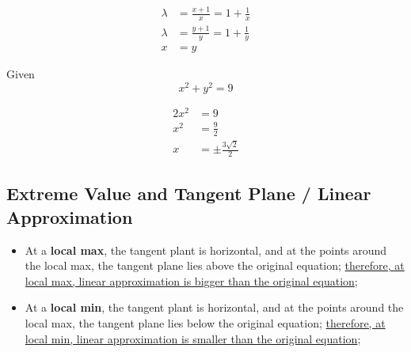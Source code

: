       \begin{align*}
        \lambda &= \frac{x + 1}{x} = 1 + \frac{1}{x} \\
        \lambda &= \frac{y + 1}{y} = 1 + \frac{1}{y} \\
        x &= y
      \end{align*}

      Given
      \begin{displaymath}
        x^{2} + y^{2} = 9
      \end{displaymath}

      \begin{align*}
        2x^{2} &= 9 \\
        x^{2} &= \frac{9}{2} \\
        x &= \pm \frac{3\sqrt{2}}{2}
      \end{align*}

  \subsection{Extreme Value and Tangent Plane / Linear Approximation}

    \begin{itemize}
      \item At a \textbf{local max}, the tangent plant is horizontal,
      and at the points around the local max, the tangent plane lies
      above the original equation;
      \ul{therefore, at local max, linear approximation is bigger than
      the original equation};
      \item At a \textbf{local min}, the tangent plant is horizontal,
      and at the points around the local max, the tangent plane lies
      below the original equation;
      \ul{therefore, at local min, linear approximation is smaller than
      the original equation};
    \end{itemize}